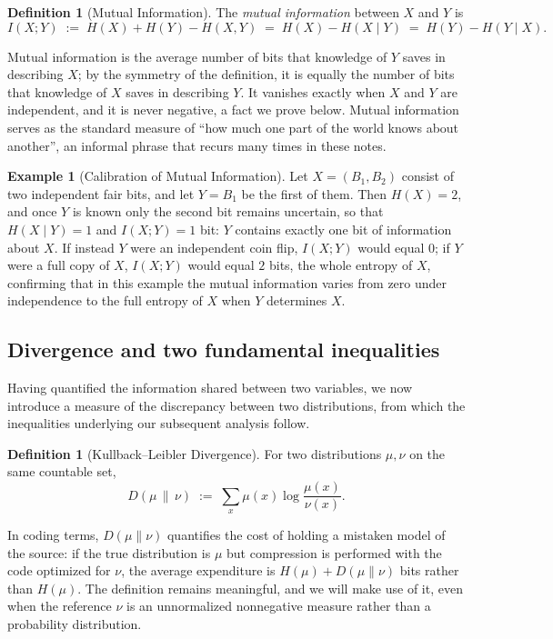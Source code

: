 \documentclass[10pt]{article}
\theoremstyle{definition}
\newtheorem{definition}[theorem]{Definition}
\newtheorem{example}[theorem]{Example}
\theoremstyle{remark}
\begin{document}
\begin{definition}[Mutual Information]
\label{def:mi}
The \emph{mutual information} between $X$ and $Y$ is
\[
I(X;Y) \;:=\; H(X) + H(Y) - H(X,Y) \;=\; H(X) - H(X \mid Y) \;=\; H(Y) - H(Y \mid X).
\]
\end{definition}

Mutual information is the average number of bits that knowledge of $Y$ saves in describing $X$; by the symmetry of the definition, it is equally the number of bits that knowledge of $X$ saves in describing $Y$. It vanishes exactly when $X$ and $Y$ are independent, and it is never negative, a fact we prove below. Mutual information serves as the standard measure of ``how much one part of the world knows about another'', an informal phrase that recurs many times in these notes.

\begin{example}[Calibration of Mutual Information]
Let $X = (B_1, B_2)$ consist of two independent fair bits, and let $Y = B_1$ be the first of them. Then $H(X) = 2$, and once $Y$ is known only the second bit remains uncertain, so that $H(X \mid Y) = 1$ and $I(X;Y) = 1$ bit: $Y$ contains exactly one bit of information about $X$. If instead $Y$ were an independent coin flip, $I(X;Y)$ would equal $0$; if $Y$ were a full copy of $X$, $I(X;Y)$ would equal $2$ bits, the whole entropy of $X$, confirming that in this example the mutual information varies from zero under independence to the full entropy of $X$ when $Y$ determines $X$.
\end{example}

\subsection{Divergence and two fundamental inequalities}

Having quantified the information shared between two variables, we now introduce a measure of the discrepancy between two distributions, from which the inequalities underlying our subsequent analysis follow.

\begin{definition}[Kullback--Leibler Divergence]
For two distributions $\mu, \nu$ on the same countable set,
\[
D(\mu \,\|\, \nu) \;:=\; \sum_x \mu(x) \log \frac{\mu(x)}{\nu(x)} .
\]
\end{definition}

In coding terms, $D(\mu \| \nu)$ quantifies the cost of holding a mistaken model of the source: if the true distribution is $\mu$ but compression is performed with the code optimized for $\nu$, the average expenditure is $H(\mu) + D(\mu\|\nu)$ bits rather than $H(\mu)$. The definition remains meaningful, and we will make use of it, even when the reference $\nu$ is an unnormalized nonnegative measure rather than a probability distribution.
\end{document}
